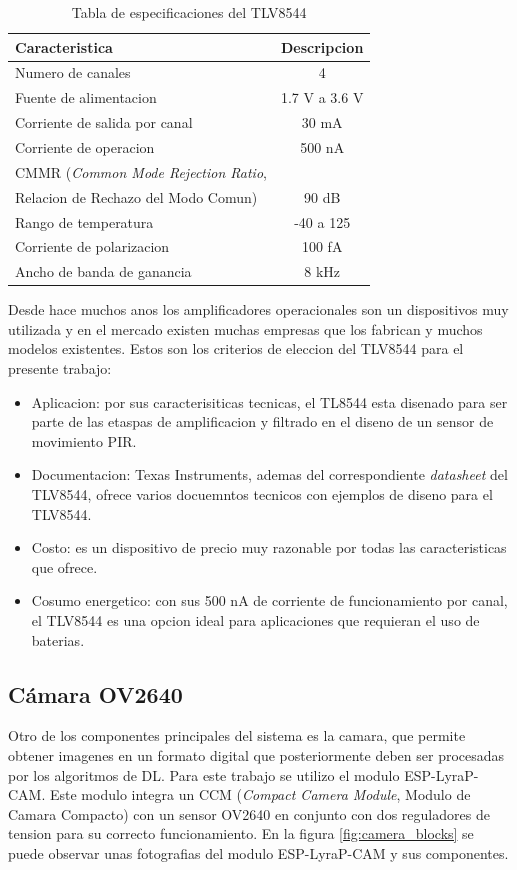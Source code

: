  \begin{table}[h]
	\centering
	\caption[TLV8544 especificaciones]{Tabla de especificaciones del TLV8544}
	\begin{tabular}{lc}    
		\toprule
		\textbf{Caracteristica} 	 & \textbf{Descripcion}  \\
		\midrule
		Numero de canales & 4 \\
		Fuente de alimentacion & 1.7 V a 3.6 V \\
		Corriente de salida por canal & 30 mA \\
		Corriente de operacion & 500 nA \\
		CMMR (\textit{Common Mode Rejection Ratio}, \\ Relacion de Rechazo del Modo Comun) & 90 dB \\
		Rango de temperatura & -40 \textcelsius  a 125 \textcelsius\\
		Corriente de polarizacion & 100 fA \\
		Ancho de banda de ganancia & 8 kHz \\
		\bottomrule
		\hline
	\end{tabular}
	\label{tab:opamp_specs}
\end{table}

Desde hace muchos anos los amplificadores operacionales son un dispositivos muy utilizada y en el mercado existen muchas empresas que los fabrican y muchos modelos existentes. Estos son los criterios de eleccion del TLV8544 para el presente trabajo:
\begin{itemize}
	\item Aplicacion: por sus caracterisiticas tecnicas, el TL8544 esta disenado para ser parte de las etaspas de amplificacion y filtrado en el diseno de un sensor de movimiento PIR.
	\item Documentacion: Texas Instruments, ademas del correspondiente \textit{datasheet} del TLV8544, ofrece varios docuemntos tecnicos con ejemplos de diseno para el TLV8544.
	\item Costo: es un dispositivo de precio muy razonable por todas las caracteristicas que ofrece.
	\item Cosumo energetico: con sus 500 nA de corriente de funcionamiento por canal, el TLV8544 es una opcion ideal para aplicaciones que requieran el uso de baterias.
\end{itemize}

\subsection{Cámara OV2640}
Otro de los componentes principales del sistema es la camara, que permite obtener imagenes en un formato digital que posteriormente deben ser procesadas por los algoritmos de DL. Para este trabajo se utilizo el modulo ESP-LyraP-CAM. Este modulo integra un CCM (\textit{Compact Camera Module}, Modulo de Camara Compacto) con un sensor OV2640 en conjunto con dos reguladores de tension para su correcto funcionamiento. En la figura \ref{fig:camera_blocks} se puede observar unas fotografias del modulo ESP-LyraP-CAM y sus componentes.

